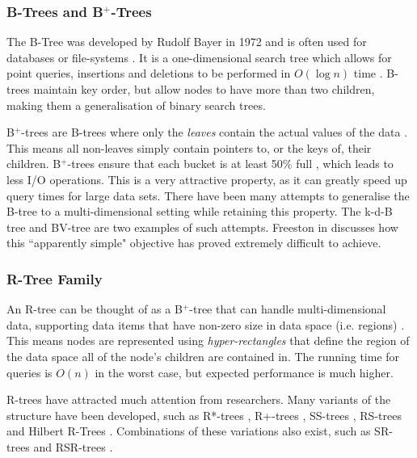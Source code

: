 \subsubsection{B-Trees and B${}^{+}$-Trees}

The B-Tree was developed by Rudolf Bayer in 1972 and is often used for databases or file-systems \cite{ubiquitous-btree}. It is a one-dimensional search tree which allows for point queries, insertions and deletions to be performed in $O(\log n)$ time \cite{btree}. B-trees maintain key order, but allow nodes to have more than two children, making them a generalisation of binary search trees.

B${}^{+}$-trees are B-trees where only the \textit{leaves} contain the actual values of the data \cite{ubiquitous-btree}. This means all non-leaves simply contain pointers to, or the keys of, their children. B${}^{+}$-trees ensure that each bucket is at least 50\% full \cite{md-structures-samet, ubiquitous-btree}, which leads to less I/O operations. This is a very attractive property, as it can greatly speed up query times for large data sets. There have been many attempts to generalise the B-tree to a multi-dimensional setting while retaining this property. The k-d-B tree \cite{kdb-tree} and BV-tree \cite{bv-tree} are two examples of such attempts. Freeston in \cite{bv-tree} discusses how this ``apparently simple" objective has proved extremely difficult to achieve.

\subsubsection{R-Tree Family}

An R-tree can be thought of as a B${}^{+}$-tree that can handle multi-dimensional data, supporting data items that have non-zero size in data space (i.e. regions) \cite{r-tree}. This means nodes are represented using \textit{hyper-rectangles} that define the region of the data space all of the node's children are contained in. The running time for queries is $O(n)$ in the worst case, but expected performance is much higher. 

R-trees have attracted much attention from researchers. Many variants of the structure have been developed, such as R*-trees \cite{rstar-tree}, R+-trees \cite{rplus-tree}, SS-trees \cite{ss-tree}, RS-trees \cite{rs-tree} and Hilbert R-Trees \cite{hilbert-rtree}. Combinations of these variations also exist, such as SR-trees \cite{md-structures-samet} and RSR-trees \cite{rsr-tree}.

